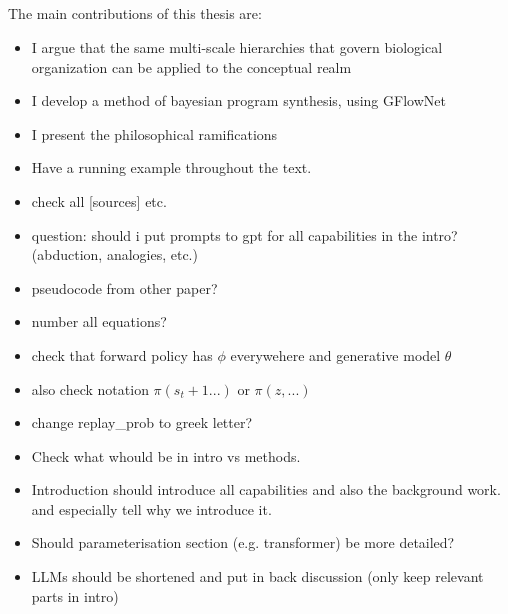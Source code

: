 
\subsection{}
The main contributions of this thesis are: 
\begin{itemize}
    \item I argue that the same multi-scale hierarchies that govern biological organization can be applied to the conceptual realm
    \item I develop a method of bayesian program synthesis, using GFlowNet
    \item I present the philosophical ramifications
\end{itemize}






\begin{itemize}
    \item Have a running example throughout the text.
    \item check all [sources] etc.
    \item question: should i put prompts to gpt for all capabilities in the intro? (abduction, analogies, etc.)
    \item pseudocode from other paper?
    \item number all equations?
    \item check that forward policy has $\phi$ everywehere and generative model $\theta$
    \item also check notation $\pi(s_t+1 ...)$ or $\pi(z,...)$
    \item change replay\_prob to greek letter?
    \item Check what whould be in intro vs methods. 
    \item Introduction should introduce all capabilities and also the background work. and especially tell why we introduce it.
    \item Should parameterisation section (e.g. transformer) be more detailed?
    \item LLMs should be shortened and put in back discussion (only keep relevant parts in intro)
\end{itemize}


















